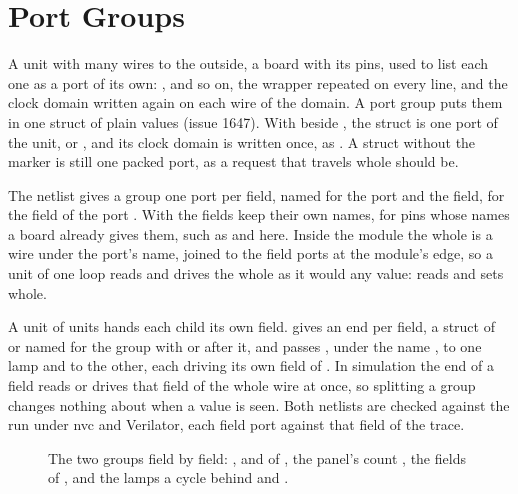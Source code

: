 \section{Port Groups}
\label{sec:x-group}

A unit with many wires to the outside, a board with its pins, used to
list each one as a port of its own: ,
 and so on, the wrapper repeated on every line, and
the clock domain written again on each wire of the domain. A port
group puts them in one struct of plain values (issue 1647). With
 beside , the struct is
one port of the unit,  or , and its clock
domain is written once, as . A struct without the
marker is still one packed port, as a request that travels whole
should be.

The netlist gives a group one port per field, named for the port and
the field,  for the field  of the port
. With  the fields keep their
own names, for pins whose names a board already gives them, such as
 and  here. Inside the module the whole is a
wire under the port's name, joined to the field ports at the module's
edge, so a unit of one loop reads and drives the whole as it would any
value:  reads  and sets  whole.

A unit of units hands each child its own field.  gives
an end per field, a struct of  or  named for the
group with  or  after it, and  passes
, under the name , to one lamp and 
to the other, each driving
its own field of . In simulation the end of a field reads or
drives that field of the whole wire at once, so splitting a group
changes nothing about when a value is seen. Both netlists are checked
against the run under nvc and Verilator, each field port against that
field of the trace.

\begin{figure}[htbp]
\centering

\caption{The two groups field by field: ,  and
 of , the panel's count , the fields of
, and the lamps a cycle behind  and .}
\label{fig:x-group}
\end{figure}




